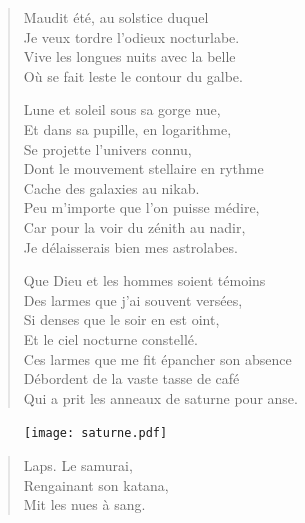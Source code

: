 \begin{verse}
  Maudit été, au solstice duquel\\  %
  Je veux tordre l’odieux nocturlabe.\\  %
  Vive les longues nuits avec la belle\\  %
  Où se fait leste le contour du galbe. 

  Lune et soleil sous sa gorge nue,\\  %
  Et dans sa pupille, en logarithme,\\  %
  Se projette l’univers connu,\\  %
  Dont le mouvement stellaire en rythme\\  %
  Cache des galaxies au nikab.\\  %
  Peu m’importe que l’on puisse médire,\\  %
  Car pour la voir du zénith au nadir,\\  %
  Je délaisserais bien mes astrolabes.

  Que Dieu et les hommes soient témoins \\ 
  Des larmes que j’ai souvent versées, \\  
  Si denses que le soir en est oint, \\  
  Et le ciel nocturne  constellé. \\  
  Ces larmes que me fit épancher son absence \\  
  Débordent de la vaste tasse de café \\ 
  Qui a prit les anneaux de saturne pour anse. 
\end{verse}

\begin{figure}[h]
  \centering
  \texttt{[image: saturne.pdf]}
  \captionsetup{labelformat=empty}
  \caption[Idéotexte de ]{}
\end{figure}


\begin{verse}\haiku
  Laps. Le samurai,\\  %
  Rengainant son katana,\\  %
  Mit les nues à sang.
\end{verse}

